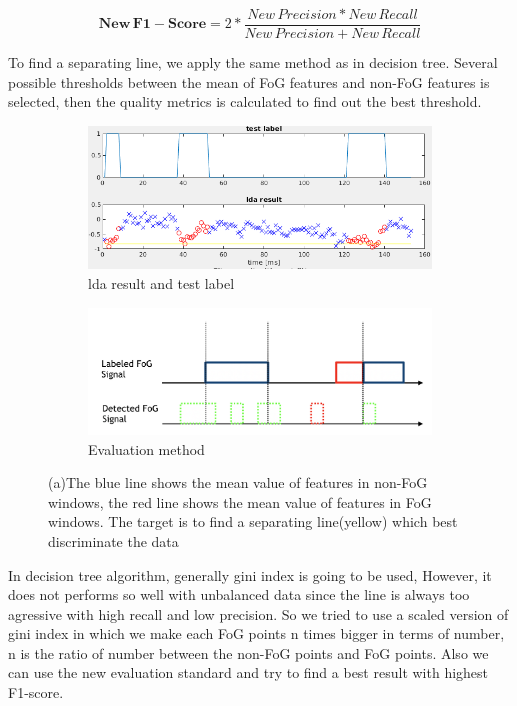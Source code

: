 \documentclass[article]{article}
\begin{document}
	\begin{equation}
	\mathbf{New\,F1-Score} = 2*\frac{New\,Precision * New\,Recall}{New\,Precision+New\,Recall}
	\end{equation}
	
	
	To find a separating line, we apply the same method as in decision tree. Several possible thresholds between the mean of FoG features and non-FoG features is selected, then the quality metrics is calculated to find out the best threshold. 
	
	\begin{figure}	
		 \begin{center}	
	\begin{subfigure}[b]{0.45\textwidth}
		\centering
		\includegraphics[width=\textwidth]{p8_lda}
		\caption{lda result and test label}
		\label{lda1}
	\end{subfigure}

	\begin{subfigure}[b]{0.45\textwidth}
	\centering
	\includegraphics[width=\textwidth]{evaluation}
	\caption{Evaluation method}
	\label{eva}	
	\end{subfigure}
	\caption{(a)The blue line shows the mean value of features in non-FoG windows, the red line shows the mean value of features in FoG windows. The target is to find a separating line(yellow) which best discriminate the data}

\end{center}
\end{figure}
	In decision tree algorithm, generally gini index is going to be used, However, it does not performs so well with unbalanced data since the line is always too agressive with high recall and low precision. So we tried to use a  scaled version of gini index in which we make each FoG points n times bigger in terms of number, n is the ratio of number between the non-FoG points and FoG points. Also we can use the new evaluation standard and try to find a best result with highest F1-score.
	
\end{document}
